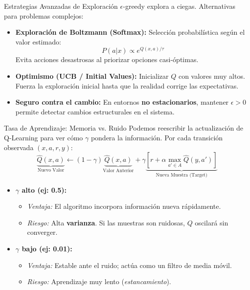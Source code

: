 \documentclass[xcolor=dvipsnames, handout]{beamer}
\begin{document}
\begin{frame}{Estrategias Avanzadas de Exploraci\'on}
$\epsilon$-greedy explora a ciegas. Alternativas para problemas complejos:

\begin{itemize}
    \item \textbf{Exploraci\'on de Boltzmann (Softmax):}
    Selecci\'on probabil\'istica seg\'un el valor estimado:
    \[ P(a|x) \propto e^{Q(x,a)/\tau} \]
    Evita acciones desastrosas al priorizar opciones casi-\'optimas.

    \item \textbf{Optimismo (UCB / Initial Values):}
    Inicializar $Q$ con valores muy altos. Fuerza la exploraci\'on inicial hasta que la realidad corrige las expectativas.

    \item \textbf{Seguro contra el cambio:}
    En entornos \textbf{no estacionarios}, mantener $\epsilon > 0$ permite detectar cambios estructurales en el sistema.
\end{itemize}
\end{frame}


\begin{frame}{Tasa de Aprendizaje: Memoria vs. Ruido}
Podemos reescribir la actualizaci\'on de Q-Learning para ver c\'omo $\gamma$ pondera la informaci\'on. Por cada transici\'on observada $(x, a, r, y)$:
\[ 
\underbrace{\hat Q(x,a)}_{\text{Nuevo Valor}} \leftarrow (1-\gamma) \underbrace{\hat Q(x,a)}_{\text{Valor Anterior}} + \gamma \underbrace{\left[ r + \alpha \max_{a' \in A} \hat Q(y,a') \right]}_{\text{Nueva Muestra (Target)}} 
\]

\begin{itemize}
    \item <2->\textbf{$\gamma$ alto (ej: 0.5):} 
    \begin{itemize}
        \item \textit{Ventaja:} El algoritmo incorpora informaci\'on nueva r\'apidamente.
        \item \textit{Riesgo:} Alta \textbf{varianza}. Si las muestras son ruidosas, $Q$ oscilar\'a sin converger.
    \end{itemize}
    \item<3-> \textbf{$\gamma$ bajo (ej: 0.01):} 
    \begin{itemize}
        \item \textit{Ventaja:} Estable ante el ruido; act\'ua como un filtro de media m\'ovil.
        \item \textit{Riesgo:} Aprendizaje muy lento (\textit{estancamiento}).
    \end{itemize}
\end{itemize}

\end{frame}
\end{document}
